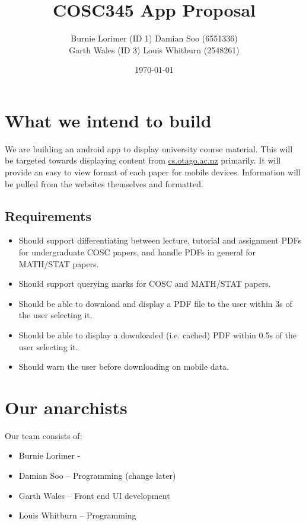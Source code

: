 \documentclass{article}
\title{COSC345 App Proposal}
\author{Burnie Lorimer (ID 1) Damian Soo (6551336) \\ Garth Wales (ID 3) Louis Whitburn (2548261)}
\date{\today}
\begin{document}
	\maketitle
	
	\section{What we intend to build}
	
	We are building an android app to display university course material. This will be targeted towards displaying content from \url{cs.otago.ac.nz} primarily. It will provide an easy to view format of each paper for mobile devices. Information will be pulled from the websites themselves and formatted.
	
	\subsection{Requirements}
	
	\begin{itemize}
		\item Should support differentiating between lecture, tutorial and assignment PDFs for undergraduate COSC papers, and handle PDFs in general for MATH/STAT papers.
		\item Should support querying marks for COSC and MATH/STAT papers.
		\item Should be able to download and display a PDF file to the user within 3s of the user selecting it.
		\item Should be able to display a downloaded (i.e. cached) PDF within 0.5s of the user selecting it.
		\item Should warn the user before downloading on mobile data.
	\end{itemize}
	
	\section{Our anarchists}
	
	Our team consists of: 
	\begin{itemize}
		\item Burnie Lorimer - 
		\item Damian Soo – Programming (change later)
		\item Garth Wales – Front end UI development
		\item Louis Whitburn – Programming
	\end{itemize}
\end{document}
